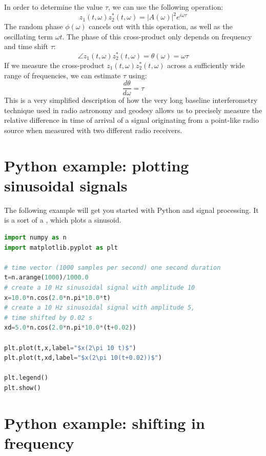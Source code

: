 In order to determine the value $\tau$, we can use the following operation:
\begin{equation}
z_1(t,\omega)z_2^*(t,\omega) = |A(\omega)|^2 e^{i\omega \tau} 
\end{equation}
The random phase $\phi(\omega)$ cancels out with this operation, as well as the oscillating term $\omega t$. The phase of this cross-product only depends on frequency and time shift $\tau$:
\begin{equation}
\angle z_1(t,\omega)z_2^*(t,\omega) = \theta(\omega)= \omega \tau
\end{equation}
If we measure the cross-product $z_1(t,\omega)z_2^*(t,\omega)$ across a sufficiently wide range of frequencies, we can estimate $\tau$ using:
\begin{equation}
\frac{d\theta}{d\omega}= \tau
\end{equation}
This is a very simplified description of how the very long baseline interferometry technique used in radio astronomy and geodesy allows us to precisely measure the relative difference in time of arrival of a signal originating from a point-like radio source when measured with two different radio receivers.

\section{Python example: plotting sinusoidal signals}

The following example will get you started with Python and signal
processing. It is a sort of a , which plots a sinusoid.
\begin{lstlisting}[language=Python]
import numpy as n
import matplotlib.pyplot as plt

# time vector (1000 samples per second) one second duration
t=n.arange(1000)/1000.0
# create a 10 Hz sinusoidal signal with amplitude 10
x=10.0*n.cos(2.0*n.pi*10.0*t)
# create a 10 Hz sinusoidal signal with amplitude 5, 
# time shifted by 0.02 s
xd=5.0*n.cos(2.0*n.pi*10.0*(t+0.02))

plt.plot(t,x,label="$x(2\pi 10 t)$")
plt.plot(t,xd,label="$x(2\pi 10(t+0.02))$")

plt.legend()
plt.show()
\end{lstlisting}
\fi

\section{Python example: shifting in frequency}

